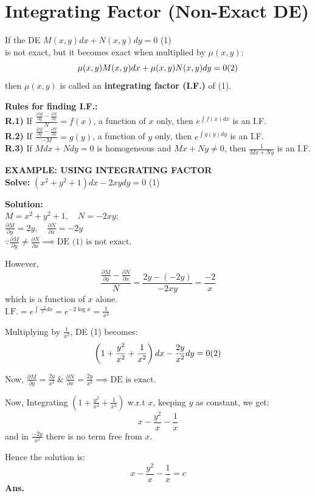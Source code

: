 \documentclass[11pt,a4paper]{article}
\begin{document}
\section{Integrating Factor (Non-Exact DE)}
If the DE $M(x,y)dx + N(x,y)dy = 0$ \hfill (1) \\
is not exact, but it becomes exact when multiplied by $\mu(x,y)$:
\[ \mu(x,y) M(x,y) dx + \mu(x,y) N(x,y) dy = 0 \hfill (2) \]
then $\mu(x,y)$ is called an \textbf{integrating factor (I.F.)} of (1).

\vspace{0.2cm}
\noindent\textbf{\textcolor{DeepNavy}{Rules for finding I.F.:}} \\
\textbf{R.1)} If $\displaystyle \frac{\frac{\partial M}{\partial y} - \frac{\partial N}{\partial x}}{N} = f(x)$, a function of $x$ only, then $e^{\int f(x)dx}$ is an I.F. \\
\textbf{R.2)} If $\displaystyle \frac{\frac{\partial M}{\partial y} - \frac{\partial N}{\partial x}}{-M} = g(y)$, a function of $y$ only, then $e^{\int g(y)dy}$ is an I.F. \\
\textbf{R.3)} If $Mdx + Ndy = 0$ is homogeneous and $Mx + Ny \neq 0$, then $\frac{1}{Mx+Ny}$ is an I.F.

\begin{tcolorbox}[colback=LightBg, colframe=BorderGray, arc=4mm]
    {\small\textbf{\textcolor{AccentBlue}{EXAMPLE: USING INTEGRATING FACTOR}}}
    \vspace{0.2cm}\\
    \textbf{Solve:} $\displaystyle (x^2+y^2+1)dx - 2xy dy = 0$ \hfill (1)
    
    \vspace{0.2cm}
    \textbf{Solution:} \\
    $M = x^2+y^2+1, \quad N = -2xy$; \\
    $\displaystyle \frac{\partial M}{\partial y} = 2y, \quad \frac{\partial N}{\partial x} = -2y$ \\
    $\displaystyle \because \frac{\partial M}{\partial y} \neq \frac{\partial N}{\partial x} \implies \text{DE (1) is not exact}.$

    However,
    \[ \frac{\frac{\partial M}{\partial y} - \frac{\partial N}{\partial x}}{N} = \frac{2y - (-2y)}{-2xy} = \frac{-2}{x} \]
    which is a function of $x$ alone. \\
    $\displaystyle \text{I.F.} = e^{\int \frac{-2}{x} dx} = e^{-2 \log x} = \frac{1}{x^2}$

    Multiplying by $\frac{1}{x^2}$, DE (1) becomes:
    \[ \left(1 + \frac{y^2}{x^2} + \frac{1}{x^2}\right)dx - \frac{2y}{x^2} dy = 0 \hfill (2) \]
    
    Now, $\displaystyle \frac{\partial M}{\partial y} = \frac{2y}{x^2} \ \& \ \frac{\partial N}{\partial x} = \frac{2y}{x^2} \implies \text{DE is exact}.$

    Now, Integrating $\left(1 + \frac{y^2}{x^2} + \frac{1}{x^2}\right)$ w.r.t $x$, keeping $y$ as constant, we get:
    \[ x - \frac{y^2}{x} - \frac{1}{x} \]
    and in $\frac{-2y}{x^2}$ there is no term free from $x$.

    Hence the solution is:
    \[ x - \frac{y^2}{x} - \frac{1}{x} = c \]
    \textbf{Ans.}
\end{tcolorbox}
\end{document}
